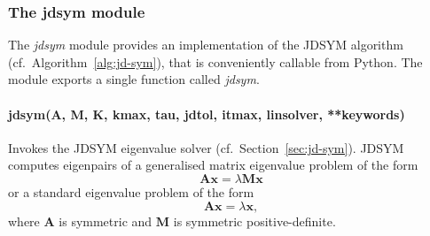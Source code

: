 \documentclass[a4paper]{article}
\newcommand{\mat}[1]{\ensuremath{\boldsymbol{#1}}}
\newcommand{\vect}[1]{\ensuremath{\mathbf{#1}}}
\begin{document}
\subsubsection{The jdsym module}
%
The \textit{jdsym} module provides an implementation of the JDSYM
algorithm (cf.\ Algorithm~\ref{alg:jd-sym}), that is conveniently
callable from Python. The module exports a single function called
\textit{jdsym}.

\paragraph{jdsym(A, M, K, kmax, tau, jdtol, itmax, linsolver, **keywords)}
%
Invokes the JDSYM eigenvalue solver (cf.\ Section~\ref{sec:jd-sym}).
JDSYM computes eigenpairs of a generalised matrix eigenvalue problem
of the form
\begin{equation}
  \label{eq:python:2}
  \mat{A} \vect{x} = \lambda \mat{M} \vect{x} 
\end{equation}
or a standard eigenvalue problem of the form
\begin{equation}
  \label{eq:python:3}
  \mat{A} \vect{x} = \lambda \vect{x},
\end{equation}
where $\mat{A}$ is symmetric and $\mat{M}$ is symmetric
positive-definite.
\end{document}
